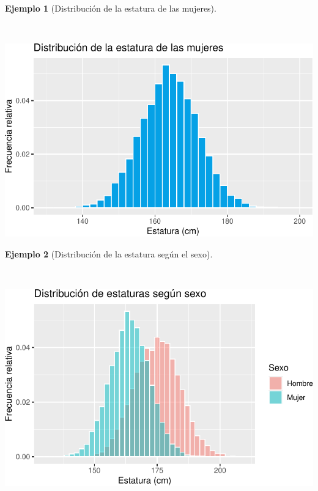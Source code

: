 \documentclass[
  a4paper,
]{scrreport}
\theoremstyle{definition}
\theoremstyle{definition}
\newtheorem{example}{Ejemplo}[chapter]
\theoremstyle{plain}
\theoremstyle{remark}
\begin{document}
\begin{example}[Distribución de la estatura de las
mujeres]\protect\hypertarget{exm-distribucion-estatura-mujeres}{}\label{exm-distribucion-estatura-mujeres}

~

\includegraphics{02-estadistica-descriptiva_files/figure-pdf/histograma-estatura-mujeres-1.pdf}

\end{example}

\begin{example}[Distribución de la estatura según el
sexo]\protect\hypertarget{exm-distribucion-estaturas-sexo}{}\label{exm-distribucion-estaturas-sexo}

~

\includegraphics{02-estadistica-descriptiva_files/figure-pdf/histograma-estatura-sexo-1.pdf}

\end{example}
\end{document}

